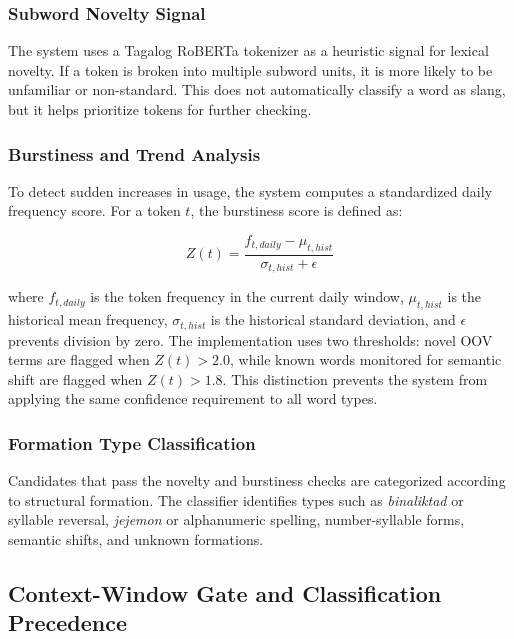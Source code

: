 \subsubsection{Subword Novelty Signal}

The system uses a Tagalog RoBERTa tokenizer as a heuristic signal for lexical novelty. If a token is broken into multiple subword units, it is more likely to be unfamiliar or non-standard. This does not automatically classify a word as slang, but it helps prioritize tokens for further checking.

\subsubsection{Burstiness and Trend Analysis}

To detect sudden increases in usage, the system computes a standardized daily frequency score. For a token $t$, the burstiness score is defined as:

\begin{equation}
Z(t) = \frac{f_{t,daily} - \mu_{t,hist}}{\sigma_{t,hist} + \epsilon}
\end{equation}

\noindent where $f_{t,daily}$ is the token frequency in the current daily window, $\mu_{t,hist}$ is the historical mean frequency, $\sigma_{t,hist}$ is the historical standard deviation, and $\epsilon$ prevents division by zero. The implementation uses two thresholds: novel OOV terms are flagged when $Z(t) > 2.0$, while known words monitored for semantic shift are flagged when $Z(t) > 1.8$. This distinction prevents the system from applying the same confidence requirement to all word types.

\subsubsection{Formation Type Classification}

Candidates that pass the novelty and burstiness checks are categorized according to structural formation. The classifier identifies types such as \textit{binaliktad} or syllable reversal, \textit{jejemon} or alphanumeric spelling, number-syllable forms, semantic shifts, and unknown formations.

\subsection{Context-Window Gate and Classification Precedence}

